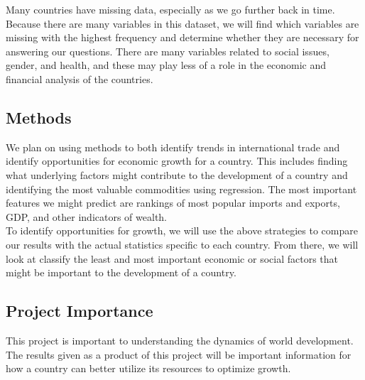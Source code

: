\documentclass[final,oneside,onecolumn]{article}
\begin{document}
Many countries have missing data, especially as we go further back in time. Because there are many variables in this dataset, we will find which variables are missing with the highest frequency and determine whether they are necessary for answering our questions. There are many variables related to social issues, gender, and health, and these may play less of a role in the economic and financial analysis of the countries. 


\subsection*{Methods}
We plan on using methods to both identify trends in international trade and identify opportunities for economic growth for a country. This includes finding what underlying factors might contribute to the development of a country and identifying the most valuable commodities using regression. The most important features we might predict are rankings of most popular imports and exports, GDP, and other indicators of wealth.
\\

To identify opportunities for growth, we will use the above strategies to compare our results with the actual statistics specific to each country. From there, we will look at classify the least and most important economic or social factors that might be important to the development of a country. 



\subsection*{Project Importance}
This project is important to understanding the dynamics of world development. The results given as a product of this project will be important information for how a country can better utilize its resources to optimize growth. 
\end{document}
